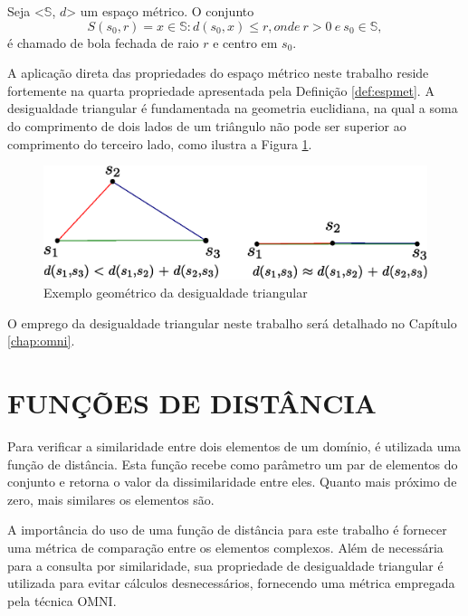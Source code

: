 \begin{mydef}
 \label{def:bola}
 Seja <$\mathbb{S}$, $d$> um espaço métrico. O conjunto
 \begin{equation}
  S(s_0,r) = {x \in \mathbb{S} : d(s_0, x) \leq r},	onde\ r > 0\ e\ s_0 \in \mathbb{S},
 \end{equation}
  é chamado de bola fechada de raio $r$ e centro em $s_0$. 
\end{mydef}

A aplicação direta das propriedades do espaço métrico neste trabalho reside fortemente na quarta propriedade apresentada pela Definição \ref{def:espmet}. A desigualdade triangular é fundamentada na geometria euclidiana, 
na qual a soma do comprimento de dois lados de um triângulo não pode ser superior ao comprimento do terceiro lado, como ilustra a Figura \ref{fig:destri}.

\begin{figure}[H]
\centering
\includegraphics[width=.8\textwidth]{dados/figuras/desig_tri.eps}
\caption{Exemplo geométrico da desigualdade triangular}
\label{fig:destri}
\end{figure}

O emprego da desigualdade triangular neste trabalho será detalhado no Capítulo \ref{chap:omni}.

\section{FUNÇÕES DE DISTÂNCIA}
\label{sec:funcdist}
Para verificar a similaridade entre dois elementos de um domínio, é utilizada uma função de distância. Esta função recebe como parâmetro um par
de elementos do conjunto e retorna o valor da dissimilaridade entre eles. Quanto mais próximo de zero, mais similares os elementos são.\par

A importância do uso de uma função de distância para este trabalho é fornecer uma métrica de comparação entre os elementos complexos. Além de
necessária para a consulta por similaridade, sua propriedade de desigualdade triangular é utilizada para evitar cálculos desnecessários, fornecendo uma métrica
empregada pela técnica OMNI.\par
